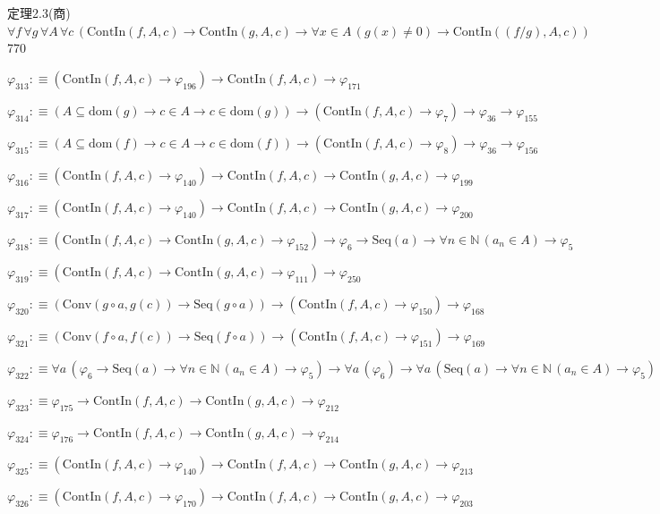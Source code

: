 \begin{fullproof}{定理2.3(商)}{$\forall f\,\forall g\,\forall A\,\forall c\,(\mathrm{ContIn}(f,A,c) \to \mathrm{ContIn}(g,A,c) \to \forall x \in A\,(g(x) \neq 0) \to \mathrm{ContIn}((f / g),A,c))$}{770}
\begin{abbrevlist}
\item $\varphi_{313} :\equiv (\mathrm{ContIn}(f,A,c) \to \varphi_{196}) \to \mathrm{ContIn}(f,A,c) \to \varphi_{171}$
\item $\varphi_{314} :\equiv (A \subseteq \mathrm{dom}(g) \to c \in A \to c \in \mathrm{dom}(g)) \to (\mathrm{ContIn}(f,A,c) \to \varphi_{7}) \to \varphi_{36} \to \varphi_{155}$
\item $\varphi_{315} :\equiv (A \subseteq \mathrm{dom}(f) \to c \in A \to c \in \mathrm{dom}(f)) \to (\mathrm{ContIn}(f,A,c) \to \varphi_{8}) \to \varphi_{36} \to \varphi_{156}$
\item $\varphi_{316} :\equiv (\mathrm{ContIn}(f,A,c) \to \varphi_{140}) \to \mathrm{ContIn}(f,A,c) \to \mathrm{ContIn}(g,A,c) \to \varphi_{199}$
\item $\varphi_{317} :\equiv (\mathrm{ContIn}(f,A,c) \to \varphi_{140}) \to \mathrm{ContIn}(f,A,c) \to \mathrm{ContIn}(g,A,c) \to \varphi_{200}$
\item $\varphi_{318} :\equiv (\mathrm{ContIn}(f,A,c) \to \mathrm{ContIn}(g,A,c) \to \varphi_{152}) \to \varphi_{6} \to \mathrm{Seq}(a) \to \forall n \in \mathbb{N}\,(a_{n} \in A) \to \varphi_{5}$
\item $\varphi_{319} :\equiv (\mathrm{ContIn}(f,A,c) \to \mathrm{ContIn}(g,A,c) \to \varphi_{111}) \to \varphi_{250}$
\item $\varphi_{320} :\equiv (\mathrm{Conv}(g \circ a,g(c)) \to \mathrm{Seq}(g \circ a)) \to (\mathrm{ContIn}(f,A,c) \to \varphi_{150}) \to \varphi_{168}$
\item $\varphi_{321} :\equiv (\mathrm{Conv}(f \circ a,f(c)) \to \mathrm{Seq}(f \circ a)) \to (\mathrm{ContIn}(f,A,c) \to \varphi_{151}) \to \varphi_{169}$
\item $\varphi_{322} :\equiv \forall a\,(\varphi_{6} \to \mathrm{Seq}(a) \to \forall n \in \mathbb{N}\,(a_{n} \in A) \to \varphi_{5}) \to \forall a\,(\varphi_{6}) \to \forall a\,(\mathrm{Seq}(a) \to \forall n \in \mathbb{N}\,(a_{n} \in A) \to \varphi_{5})$
\item $\varphi_{323} :\equiv \varphi_{175} \to \mathrm{ContIn}(f,A,c) \to \mathrm{ContIn}(g,A,c) \to \varphi_{212}$
\item $\varphi_{324} :\equiv \varphi_{176} \to \mathrm{ContIn}(f,A,c) \to \mathrm{ContIn}(g,A,c) \to \varphi_{214}$
\item $\varphi_{325} :\equiv (\mathrm{ContIn}(f,A,c) \to \varphi_{140}) \to \mathrm{ContIn}(f,A,c) \to \mathrm{ContIn}(g,A,c) \to \varphi_{213}$
\item $\varphi_{326} :\equiv (\mathrm{ContIn}(f,A,c) \to \varphi_{170}) \to \mathrm{ContIn}(f,A,c) \to \mathrm{ContIn}(g,A,c) \to \varphi_{203}$

\end{abbrevlist}
\end{fullproof}
